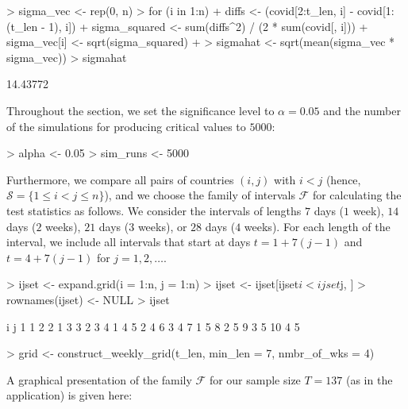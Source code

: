 \documentclass[a4paper]{article}
\begin{document}
\begin{Schunk}
\begin{Sinput}
> sigma_vec <- rep(0, n)
> for (i in 1:n){
+   diffs <- (covid[2:t_len, i] - covid[1:(t_len - 1), i])
+   sigma_squared <- sum(diffs^2) / (2 * sum(covid[, i]))
+   sigma_vec[i] <- sqrt(sigma_squared)
+ }
> sigmahat <- sqrt(mean(sigma_vec * sigma_vec))
> sigmahat
\end{Sinput}
\begin{Soutput}
[1] 14.43772
\end{Soutput}
\end{Schunk}

Throughout the section, we set the significance level to $\alpha=0.05$ and the number of the simulations for producing critical values to $5000$:

\begin{Schunk}
\begin{Sinput}
> alpha    <- 0.05
> sim_runs <- 5000
\end{Sinput}
\end{Schunk}

Furthermore, we compare all pairs of countries $(i,j)$ with $i < j$ (hence, $\mathcal{S} = \{1 \leq i < j \leq n\}$), and we choose the family of intervals $\mathcal{F}$ for calculating the test statistics as follows. We consider the intervals of lengths $7$ days ($1$ week), $14$ days ($2$ weeks), $21$ days ($3$ weeks), or $28$ days ($4$ weeks). For each length of the interval, we include all intervals that start at days $t = 1 + 7(j-1)$ and $t = 4 + 7(j-1)$ for $j=1,2,\ldots$.

\begin{Schunk}
\begin{Sinput}
> ijset           <- expand.grid(i = 1:n, j = 1:n)
> ijset           <- ijset[ijset$i < ijset$j, ]
> rownames(ijset) <- NULL
> ijset
\end{Sinput}
\begin{Soutput}
   i j
1  1 2
2  1 3
3  2 3
4  1 4
5  2 4
6  3 4
7  1 5
8  2 5
9  3 5
10 4 5
\end{Soutput}
\begin{Sinput}
> grid <- construct_weekly_grid(t_len, min_len = 7, nmbr_of_wks = 4)
\end{Sinput}
\end{Schunk}

A graphical presentation of the family $\mathcal{F}$ for our sample size $T = 137$ (as in the application) is given here:
\begin{Schunk}
\end{Schunk}
\end{document}
